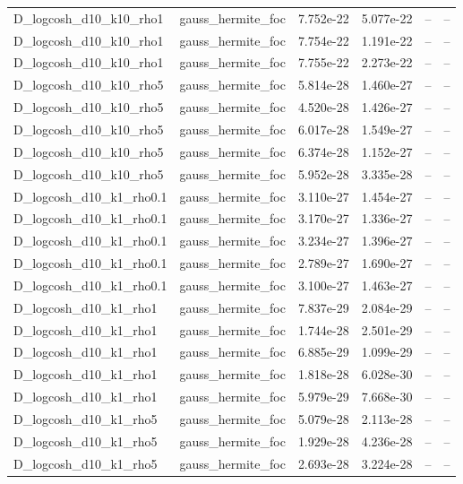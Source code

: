 \begin{tabular}{llllll}
D\_logcosh\_d10\_k10\_rho1 & gauss\_hermite\_foc & 7.752e-22 & 5.077e-22 & -- & -- \\
D\_logcosh\_d10\_k10\_rho1 & gauss\_hermite\_foc & 7.754e-22 & 1.191e-22 & -- & -- \\
D\_logcosh\_d10\_k10\_rho1 & gauss\_hermite\_foc & 7.755e-22 & 2.273e-22 & -- & -- \\
D\_logcosh\_d10\_k10\_rho5 & gauss\_hermite\_foc & 5.814e-28 & 1.460e-27 & -- & -- \\
D\_logcosh\_d10\_k10\_rho5 & gauss\_hermite\_foc & 4.520e-28 & 1.426e-27 & -- & -- \\
D\_logcosh\_d10\_k10\_rho5 & gauss\_hermite\_foc & 6.017e-28 & 1.549e-27 & -- & -- \\
D\_logcosh\_d10\_k10\_rho5 & gauss\_hermite\_foc & 6.374e-28 & 1.152e-27 & -- & -- \\
D\_logcosh\_d10\_k10\_rho5 & gauss\_hermite\_foc & 5.952e-28 & 3.335e-28 & -- & -- \\
D\_logcosh\_d10\_k1\_rho0.1 & gauss\_hermite\_foc & 3.110e-27 & 1.454e-27 & -- & -- \\
D\_logcosh\_d10\_k1\_rho0.1 & gauss\_hermite\_foc & 3.170e-27 & 1.336e-27 & -- & -- \\
D\_logcosh\_d10\_k1\_rho0.1 & gauss\_hermite\_foc & 3.234e-27 & 1.396e-27 & -- & -- \\
D\_logcosh\_d10\_k1\_rho0.1 & gauss\_hermite\_foc & 2.789e-27 & 1.690e-27 & -- & -- \\
D\_logcosh\_d10\_k1\_rho0.1 & gauss\_hermite\_foc & 3.100e-27 & 1.463e-27 & -- & -- \\
D\_logcosh\_d10\_k1\_rho1 & gauss\_hermite\_foc & 7.837e-29 & 2.084e-29 & -- & -- \\
D\_logcosh\_d10\_k1\_rho1 & gauss\_hermite\_foc & 1.744e-28 & 2.501e-29 & -- & -- \\
D\_logcosh\_d10\_k1\_rho1 & gauss\_hermite\_foc & 6.885e-29 & 1.099e-29 & -- & -- \\
D\_logcosh\_d10\_k1\_rho1 & gauss\_hermite\_foc & 1.818e-28 & 6.028e-30 & -- & -- \\
D\_logcosh\_d10\_k1\_rho1 & gauss\_hermite\_foc & 5.979e-29 & 7.668e-30 & -- & -- \\
D\_logcosh\_d10\_k1\_rho5 & gauss\_hermite\_foc & 5.079e-28 & 2.113e-28 & -- & -- \\
D\_logcosh\_d10\_k1\_rho5 & gauss\_hermite\_foc & 1.929e-28 & 4.236e-28 & -- & -- \\
D\_logcosh\_d10\_k1\_rho5 & gauss\_hermite\_foc & 2.693e-28 & 3.224e-28 & -- & -- \\

\end{tabular}
